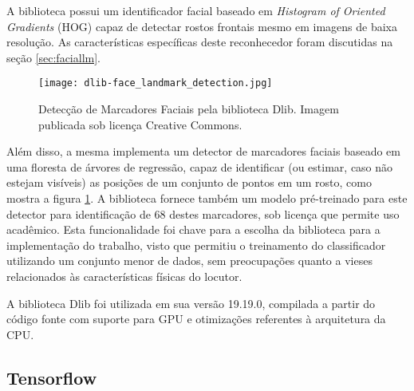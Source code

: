 A biblioteca possui um identificador facial baseado em \textit{Histogram of Oriented Gradients} (HOG) capaz de detectar rostos frontais mesmo em imagens de baixa resolução.
As características específicas deste reconhecedor foram discutidas na seção \ref{sec:faciallm}.


\begin{figure}[ht]
    \centering
    \texttt{[image: dlib-face\_landmark\_detection.jpg]}    
    \caption{Detecção de Marcadores Faciais pela biblioteca Dlib. Imagem publicada sob licença Creative Commons\cite{mtheilerDeteccaoMarcadoresFaciais2019}. }
    \label{fig:dlib-landmarking}
\end{figure}

Além disso, a mesma implementa um detector de marcadores faciais baseado em uma floresta de árvores de regressão, capaz de identificar (ou estimar, caso não estejam visíveis) as posições de um conjunto de pontos em um rosto, como mostra a figura \ref{fig:dlib-landmarking}.
A biblioteca fornece também um modelo pré-treinado para este detector para identificação de 68 destes marcadores, sob licença que permite uso acadêmico.
Esta funcionalidade foi chave para a escolha da biblioteca para a implementação do trabalho, visto que permitiu o treinamento do classificador utilizando um conjunto menor de dados, sem preocupações quanto a vieses relacionados às características físicas do locutor.

A biblioteca Dlib foi utilizada em sua versão 19.19.0, compilada a partir do código fonte com suporte para GPU e otimizações referentes à arquitetura da CPU.

\subsection{Tensorflow}
\label{subsec:tf}

